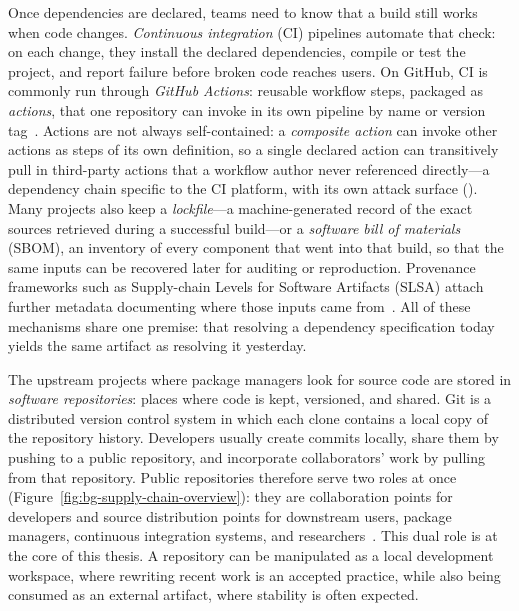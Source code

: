Once dependencies are declared, teams need to know that a build still works when code changes.
\emph{Continuous integration} (CI) pipelines automate that check: on each change, they install the declared dependencies, compile or test the project, and report failure before broken code reaches users.
On GitHub, CI is commonly run through \emph{GitHub Actions}: reusable workflow steps, packaged as \emph{actions}, that one repository can invoke in its own pipeline by name or version tag~\cite{github_composite_actions}.
Actions are not always self-contained: a \emph{composite action} can invoke other actions as steps of its own definition, so a single declared action can transitively pull in third-party actions that a workflow author never referenced directly---a dependency chain specific to the CI platform, with its own attack surface ().
Many projects also keep a \emph{lockfile}---a machine-generated record of the exact sources retrieved during a successful build---or a \emph{software bill of materials} (SBOM), an inventory of every component that went into that build, so that the same inputs can be recovered later for auditing or reproduction.
Provenance frameworks such as Supply-chain Levels for Software Artifacts (SLSA) attach further metadata documenting where those inputs came from~\cite{tamanna2024analyzingchallengesdeploymentslsa}.
All of these mechanisms share one premise: that resolving a dependency specification today yields the same artifact as resolving it yesterday.

The upstream projects where package managers look for source code are stored in \emph{software repositories}: places where code is kept, versioned, and shared.
Git is a distributed version control system in which each clone contains a local copy of the repository history.
Developers usually create commits locally, share them by pushing to a public repository, and incorporate collaborators' work by pulling from that repository.
Public repositories therefore serve two roles at once (Figure~\ref{fig:bg-supply-chain-overview}): they are collaboration points for developers and source distribution points for downstream users, package managers, continuous integration systems, and researchers~\cite[§5, Distributed Git]{ProGit2014}.
This dual role is at the core of this thesis.
A repository can be manipulated as a local development workspace, where rewriting recent work is an accepted practice, while also being consumed as an external artifact, where stability is often expected.

